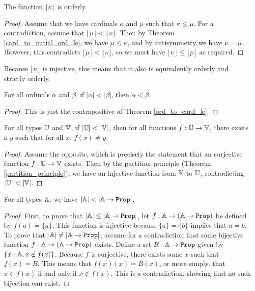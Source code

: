\documentclass[../../math.tex]{subfiles}
\begin{document}
\begin{instance}
    The function $\lfloor \kappa \rfloor$ is orderly.
\end{instance}
\begin{proof}
    Assume that we have cardinals $\kappa$ and $\mu$ such that $\kappa \leq
    \mu$.  For a contradiction, assume that $\lfloor \mu \rfloor < \lfloor
    \kappa \rfloor$.  Then by Theorem \ref{card_to_initial_ord_le}, we have $\mu
    \leq \kappa$, and by antisymmetry we have $\kappa = \mu$.  However, this
    contradicts $\lfloor \mu \rfloor < \lfloor \kappa \rfloor$, so we must have
    $\lfloor \kappa \rfloor \leq \lfloor \mu \rfloor$ as required.
\end{proof}

Because $\lfloor \kappa \rfloor$ is injective, this means that it also is
equivalently orderly and strictly orderly.

\begin{theorem} \label{ord_to_card_lt}
    For all ordinals $\alpha$ and $\beta$, if $|\alpha| < |\beta|$, then $\alpha
    < \beta$.
\end{theorem}
\begin{proof}
    This is just the contrapositive of Theorem \ref{ord_to_card_le}.
\end{proof}

\begin{theorem} \label{card_lt_ex}
    For all types $\mathbb{U}$ and $\mathbb{V}$, if $|\mathbb{U}| < |\mathbb{V}|$, then for all functions $f :
    \mathbb{U} \to \mathbb{V}$, there exists a $y$ such that for all $x$, $f(x) \neq y$.
\end{theorem}
\begin{proof}
    Assume the opposite, which is precisely the statement that an surjective
    function $f : \mathbb{U} \to \mathbb{V}$ exists.  Then by the partition principle (Theorem
    \ref{partition_principle}), we have an injective function from $\mathbb{V}$ to $\mathbb{U}$,
    contradicting $|\mathbb{U}| < |\mathbb{V}|$.
\end{proof}

\begin{theorem} \label{power_set_bigger}
    For all types $\mathbb{A}$, we have $|\A| < |\A \to \Prop|$.
\end{theorem}
\begin{proof}
    First, to prove that $|\A| \leq |\A \to \Prop|$, let $f : \A \to (\A \to
    \Prop)$ be defined by $f(a) = \{a\}$.  This function is injective because
    $\{a\} = \{b\}$ implies that $a = b$.  To prove that $|\A| \neq |\A \to
    \Prop|$, assume for a contradiction that some bijective function $f : \A \to
    (\A \to \Prop)$ exists.  Define a set $B : \A \to \Prop$ given by $\{x : \mathbb{A},
    x \notin f(x)\}$.  Because $f$ is surjective, there exists some $x$ such
    that $f(x) = B$.  This means that $f(x)(x) = B(x)$, or more simply, that $x
    \in f(x)$ if and only if $x \notin f(x)$.  This is a contradiction, showing
    that no such bijection can exist.
\end{proof}
\end{document}
